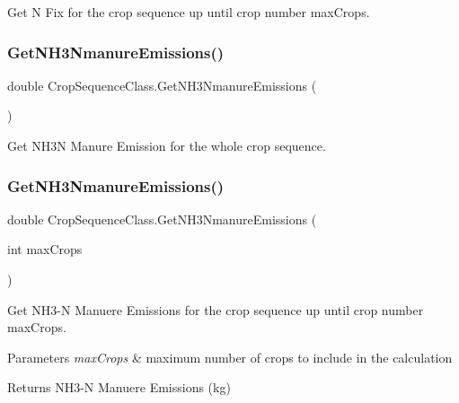 Get N Fix for the crop sequence up until crop number max\+Crops. 

\mbox{\label{class_crop_sequence_class_ae6d531161720a04116b3bff390c6c51e}} 
\subsubsection{\texorpdfstring{GetNH3NmanureEmissions()}{GetNH3NmanureEmissions()}\hspace{0.1cm}{\footnotesize\ttfamily [1/2]}}
{\footnotesize\ttfamily double Crop\+Sequence\+Class.\+Get\+N\+H3\+Nmanure\+Emissions (\begin{DoxyParamCaption}{ }\end{DoxyParamCaption})\hspace{0.3cm}{\ttfamily [inline]}}



Get N\+H3N Manure Emission for the whole crop sequence. 

\mbox{\label{class_crop_sequence_class_a7f13a7bbf89986c17605e4df01576abf}} 
\subsubsection{\texorpdfstring{GetNH3NmanureEmissions()}{GetNH3NmanureEmissions()}\hspace{0.1cm}{\footnotesize\ttfamily [2/2]}}
{\footnotesize\ttfamily double Crop\+Sequence\+Class.\+Get\+N\+H3\+Nmanure\+Emissions (\begin{DoxyParamCaption}\item[{int}]{max\+Crops }\end{DoxyParamCaption})\hspace{0.3cm}{\ttfamily [inline]}}



Get N\+H3-\/N Manuere Emissions for the crop sequence up until crop number max\+Crops. 


\begin{DoxyParams}{Parameters}
{\em max\+Crops} & maximum number of crops to include in the calculation \\
\hline
\end{DoxyParams}
\begin{DoxyReturn}{Returns}
N\+H3-\/N Manuere Emissions (kg) 
\end{DoxyReturn}
\mbox{\label{class_crop_sequence_class_a4c9e7270b6302c4458acde8c07c378c1}} 
